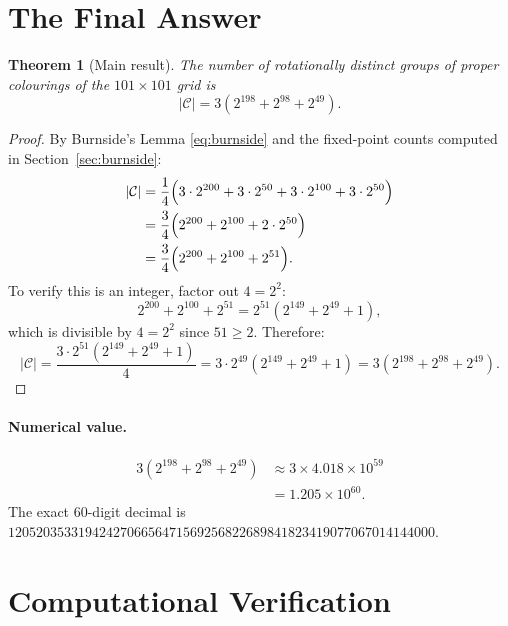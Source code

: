 \documentclass{article}
\newtheorem{theorem}{Theorem}[section]
\newcommand{\calC}{\mathcal{C}}
\begin{document}
\section{The Final Answer}
\label{sec:answer}

\begin{theorem}[Main result]
\label{thm:main}
The number of rotationally distinct groups of proper
colourings of the $101\times 101$ grid is
\[
  |\calC| = 3\!\left(2^{198}+2^{98}+2^{49}\right).
\]
\end{theorem}

\begin{proof}
By Burnside's Lemma \eqref{eq:burnside} and the fixed-point
counts computed in Section~\ref{sec:burnside}:
\begin{align*}
  |\calC|
  &= \frac{1}{4}\Bigl(3\cdot 2^{200}
    + 3\cdot 2^{50}
    + 3\cdot 2^{100}
    + 3\cdot 2^{50}\Bigr) \\
  &= \frac{3}{4}\Bigl(2^{200} + 2^{100} + 2\cdot 2^{50}\Bigr) \\
  &= \frac{3}{4}\Bigl(2^{200} + 2^{100} + 2^{51}\Bigr).
\end{align*}
To verify this is an integer, factor out $4 = 2^2$:
\[
  2^{200} + 2^{100} + 2^{51}
  = 2^{51}\!\left(2^{149} + 2^{49} + 1\right),
\]
which is divisible by $4 = 2^2$ since $51 \geq 2$.  Therefore:
\[
  |\calC| = \frac{3\cdot 2^{51}(2^{149}+2^{49}+1)}{4}
  = 3\cdot 2^{49}(2^{149}+2^{49}+1)
  = 3(2^{198}+2^{98}+2^{49}).
\]
\end{proof}

\paragraph{Numerical value.}
\begin{align*}
  3(2^{198}+2^{98}+2^{49})
  &\approx 3\times 4.018\times 10^{59} \\
  &= 1.205\times 10^{60}.
\end{align*}
The exact 60-digit decimal is
$1205203533194242706656471569256822689841823419077067014144000$.

\section{Computational Verification}
\label{sec:verification}
\end{document}
